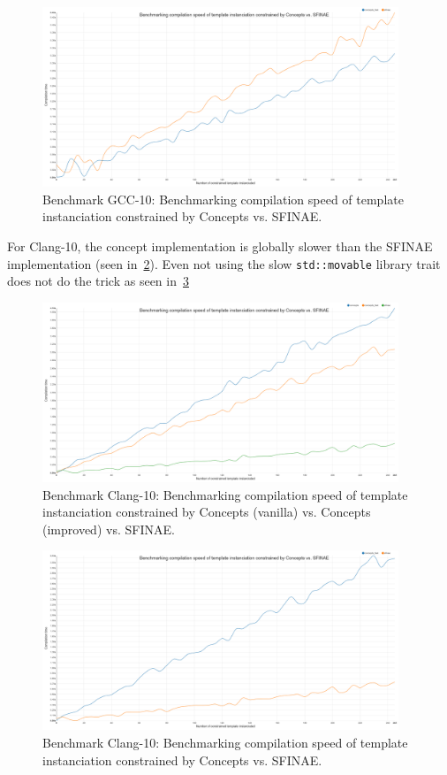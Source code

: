 \begin{figure}[htb]
  \centering
  \includegraphics[width=4.2in]{figs/compile_time_benches/gcc10/chart.concept2.png}
  \caption{Benchmark GCC-10: Benchmarking compilation speed of template instanciation constrained by Concepts vs. SFINAE.}
  \label{fig.gen.bench.gcc10.2.concept.sfinae}
\end{figure}

For Clang-10, the concept implementation is globally slower than the SFINAE implementation (seen
in~\cref{fig.gen.bench.clang10.1.concept.sfinae}). Even not using the slow \texttt{std::movable} library trait does not
do the trick as seen in~\cref{fig.gen.bench.clang10.2.concept.sfinae}

\begin{figure}[htb]
  \centering
  \includegraphics[width=4.2in]{figs/compile_time_benches/clang10/chart.concept.png}
  \caption{Benchmark Clang-10: Benchmarking compilation speed of template instanciation constrained by Concepts (vanilla) vs. Concepts (improved) vs. SFINAE.}
  \label{fig.gen.bench.clang10.1.concept.sfinae}
\end{figure}

\begin{figure}[htb]
  \centering
  \includegraphics[width=4.2in]{figs/compile_time_benches/clang10/chart.concept2.png}
  \caption{Benchmark Clang-10: Benchmarking compilation speed of template instanciation constrained by Concepts vs. SFINAE.}
  \label{fig.gen.bench.clang10.2.concept.sfinae}
\end{figure}

